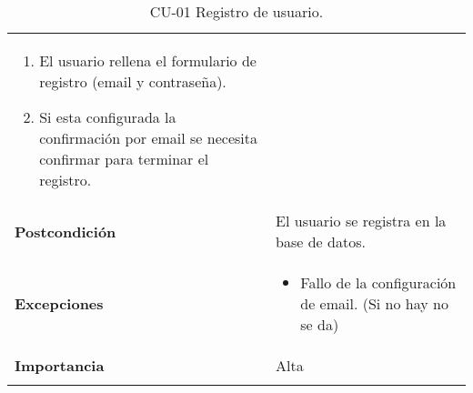 \begin{longtable}[H]{@{}ll@{}}
\begin{minipage}[t]{0.68\columnwidth}
\begin{enumerate}
\def\labelenumi{\arabic{enumi}.}
\tightlist
\item
  El usuario rellena el formulario de registro (email y contraseña).
\item
  Si esta configurada la confirmación por email se necesita confirmar para terminar el registro.
\end{enumerate}\strut
\end{minipage}\tabularnewline
\begin{minipage}[t]{0.26\columnwidth}\raggedright\strut
\textbf{Postcondición}\strut
\end{minipage} & \begin{minipage}[t]{0.68\columnwidth}\raggedright\strut%
El usuario se registra en la base de datos.\strut
\end{minipage}\tabularnewline
\begin{minipage}[t]{0.26\columnwidth}\raggedright\strut
\textbf{Excepciones}\strut
\end{minipage} & \begin{minipage}[t]{0.68\columnwidth}\raggedright\strut%
\begin{itemize}
\tightlist
\item
  Fallo de la configuración de email. (Si no hay no se da)
\end{itemize}\strut
\end{minipage}\tabularnewline
\begin{minipage}[t]{0.26\columnwidth}\raggedright\strut
\textbf{Importancia}\strut
\end{minipage} & \begin{minipage}[t]{0.68\columnwidth}\raggedright\strut%
Alta\strut
\end{minipage}\tabularnewline
\bottomrule%
\caption{CU-01 Registro de usuario.}
\end{longtable}


